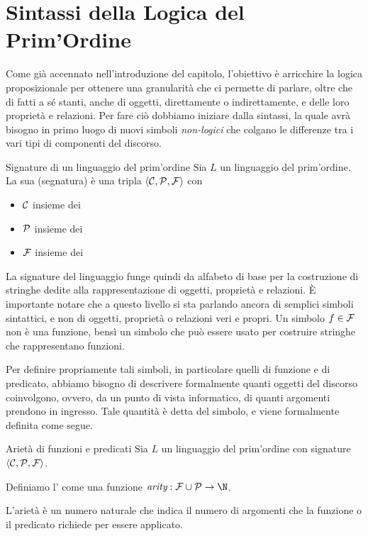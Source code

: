 \section{Sintassi della Logica del Prim'Ordine}

Come già accennato nell'introduzione del capitolo, l'obiettivo è arricchire la logica proposizionale per ottenere una granularità che ci permette di parlare, oltre che di fatti a sé stanti, anche di oggetti, direttamente o indirettamente, e delle loro proprietà e relazioni. Per fare ciò dobbiamo iniziare dalla sintassi, la quale avrà bisogno in primo luogo di nuovi simboli \textit{non-logici} che colgano le differenze tra i vari tipi di componenti del discorso.

\begin{definition}{Signature di un linguaggio del prim'ordine}
  Sia \(L\) un linguaggio del prim'ordine. La sua  (segnatura) è una tripla \(\langle \mathcal{C}, \mathcal{P}, \mathcal{F} \rangle\) con 
  \begin{itemize}
    \item \(\mathcal{C}\) insieme dei 
    \item \(\mathcal{P}\) insieme dei 
    \item \(\mathcal{F}\) insieme dei 
  \end{itemize}
\end{definition}

La signature del linguaggio funge quindi da alfabeto di base per la costruzione di stringhe dedite alla rappresentazione di oggetti, proprietà e relazioni. È importante notare che a questo livello si sta parlando ancora di semplici simboli sintattici, e non di oggetti, proprietà o relazioni veri e propri. Un simbolo \(f \in \mathcal{F}\) non è una funzione, bensì un simbolo che può essere usato per costruire stringhe che rappresentano funzioni.

Per definire propriamente tali simboli, in particolare quelli di funzione e di predicato, abbiamo bisogno di descrivere formalmente quanti oggetti del discorso coinvolgono, ovvero, da un punto di vista informatico, di quanti argomenti prendono in ingresso. Tale quantità è detta  del simbolo, e viene formalmente definita come segue.

\begin{definition}{Arietà di funzioni e predicati}
  Sia \(L\) un linguaggio del prim'ordine con signature \(\langle \mathcal{C}, \mathcal{P}, \mathcal{F} \rangle\). 
  
  Definiamo l' come una funzione \(\arty: \FuncSyms\cup\PredSyms\to\N\). 
  
  L'arietà è un numero naturale che indica il numero di argomenti che la funzione o il predicato richiede per essere applicato.
\end{definition}

